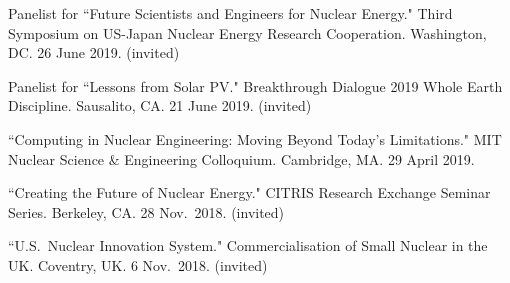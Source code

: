 \begin{bibsection}
\item Panelist for ``Future Scientists and Engineers for Nuclear Energy." Third Symposium on US-Japan Nuclear Energy Research Cooperation. Washington, DC. 26 June 2019. (invited)

\item Panelist for ``Lessons from Solar PV." Breakthrough Dialogue 2019 Whole Earth Discipline. Sausalito, CA. 21 June 2019. (invited)




\item ``Computing in Nuclear Engineering: Moving Beyond Today's Limitations." MIT Nuclear Science \& Engineering Colloquium. Cambridge, MA. 29 April 2019.



\item ``Creating the Future of Nuclear Energy." CITRIS Research Exchange Seminar Series. Berkeley, CA. 28 Nov.\ 2018. (invited)



\item ``U.S.\ Nuclear Innovation System." Commercialisation of Small Nuclear in the UK. Coventry, UK. 6 Nov.\ 2018. (invited)


\end{bibsection}
